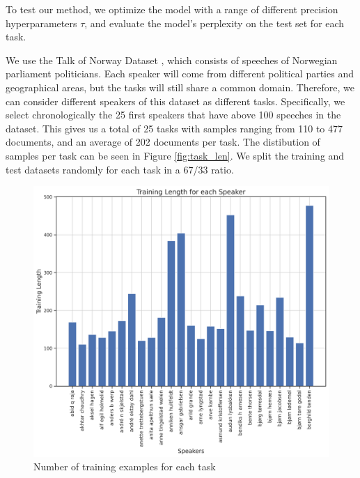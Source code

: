 \documentclass{article}
\begin{document}
To test our method, we optimize the model with a range of different precision hyperparameters $\tau$, and evaluate the model's perplexity on the test set for each task.


We use the Talk of Norway Dataset \cite{lapponi_talk_2018}, which consists of speeches of Norwegian parliament politicians. Each speaker will come from different political parties and geographical areas, but the tasks will still share a common domain. Therefore, we can consider different speakers of this dataset as different tasks. Specifically, we select chronologically the 25 first speakers that have above 100 speeches in the dataset.
This gives us a total of 25 tasks with samples ranging from 110 to 477 documents, and an average of 202 documents per task.
The distibution of samples per task can be seen in Figure \ref{fig:task_len}.
We split the training and test datasets randomly for each task in a 67/33 ratio.

\begin{figure}[h] \label{fig:task_len}
    \centering
    \includegraphics[width=\textwidth]{figures/training_lengths.png}
    \caption{Number of training examples for each task}
    \label{fig:training_lengths}
\end{figure}
\end{document}
